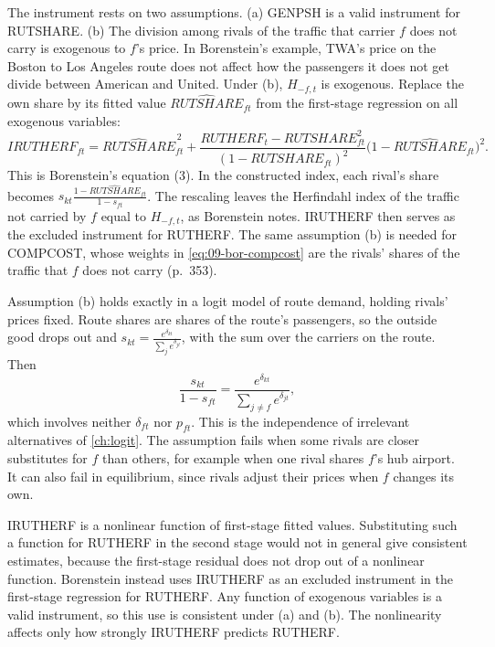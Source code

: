 The instrument rests on two assumptions. (a) GENPSH is a valid instrument for RUTSHARE. (b) The division among
rivals of the traffic that carrier $f$ does not carry is exogenous to $f$'s price. In Borenstein's example,
TWA's price on the Boston to Los Angeles route does not affect how the passengers it does not get divide between
American and United. Under (b), $H_{-f,t}$ is exogenous. Replace the own share by its fitted value
$\widehat{\mathit{RUTSHARE}}_{ft}$ from the first-stage regression on all exogenous variables:
\begin{equation}\label{eq:09-irutherf}
\mathit{IRUTHERF}_{ft} = \widehat{\mathit{RUTSHARE}}_{ft}^{\,2}
+ \frac{\mathit{RUTHERF}_t - \mathit{RUTSHARE}_{ft}^2}{(1 - \mathit{RUTSHARE}_{ft})^2}
\big(1 - \widehat{\mathit{RUTSHARE}}_{ft}\big)^2 .
\end{equation}
This is Borenstein's equation (3). In the constructed index, each rival's share becomes
$s_{kt} \frac{1 - \widehat{\mathit{RUTSHARE}}_{ft}}{1 - s_{ft}}$. The rescaling leaves the Herfindahl index of the
traffic not carried by $f$ equal to $H_{-f,t}$, as Borenstein notes. IRUTHERF then serves as the excluded
instrument for RUTHERF. The same assumption (b) is needed for COMPCOST, whose weights in
\cref{eq:09-bor-compcost} are the rivals' shares of the traffic that $f$ does not carry (p.~353).

\begin{remark}\label{rem:09-bor-iia}
Assumption (b) holds exactly in a logit model of route demand, holding rivals' prices fixed. Route shares are
shares of the route's passengers, so the outside good drops out and
$s_{kt} = \frac{e^{\delta_{kt}}}{\sum_{j} e^{\delta_{jt}}}$, with the sum over the carriers on the route. Then
\begin{equation*}
\frac{s_{kt}}{1 - s_{ft}} = \frac{e^{\delta_{kt}}}{\sum_{j \neq f} e^{\delta_{jt}}} ,
\end{equation*}
which involves neither $\delta_{ft}$ nor $p_{ft}$. This is the independence of irrelevant alternatives of
\cref{ch:logit}. The assumption fails when some rivals are closer substitutes for $f$ than others, for example
when one rival shares $f$'s hub airport. It can also fail in equilibrium, since rivals adjust their prices when
$f$ changes its own.
\end{remark}

\begin{remark}\label{rem:09-bor-generated}
IRUTHERF is a nonlinear function of first-stage fitted values. Substituting such a function for RUTHERF in the
second stage would not in general give consistent estimates, because the first-stage residual does not drop out
of a nonlinear function. Borenstein instead uses IRUTHERF as an excluded instrument in the first-stage regression
for RUTHERF. Any function of exogenous variables is a valid instrument, so this use is consistent under (a) and
(b). The nonlinearity affects only how strongly IRUTHERF predicts RUTHERF.
\end{remark}

